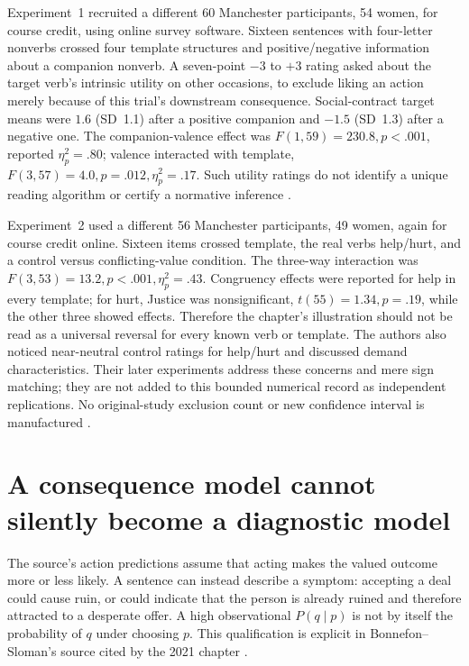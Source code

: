 Experiment~1 recruited a different 60 Manchester participants, 54 women,
for course credit, using online survey software. Sixteen sentences with
four-letter nonverbs crossed four template structures and positive/negative
information about a companion nonverb. A seven-point \(-3\) to \(+3\)
rating asked about the target verb's intrinsic utility on other occasions,
to exclude liking an action merely because of this trial's downstream
consequence. Social-contract target means were \(1.6\) (SD~1.1) after a
positive companion and \(-1.5\) (SD~1.3) after a negative one.
The companion-valence effect was \(F(1,59)=230.8,p<.001\), reported
\(\eta_p^2=.80\); valence interacted with template,
\(F(3,57)=4.0,p=.012,\eta_p^2=.17\). Such utility ratings
do not identify a unique reading algorithm or certify a normative inference
\cite[pp.~354--355]{BonnefonHaighStewart2013Templates}.

Experiment~2 used a different 56 Manchester participants, 49 women, again
for course credit online. Sixteen items crossed template, the real verbs
help/hurt, and a control versus conflicting-value condition. The three-way
interaction was \(F(3,53)=13.2,p<.001,\eta_p^2=.43\).
Congruency effects were reported for help in every template; for hurt,
Justice was nonsignificant, \(t(55)=1.34,p=.19\), while the other
three showed effects. Therefore the chapter's illustration should not be
read as a universal reversal for every known verb or template. The authors
also noticed near-neutral control ratings for help/hurt and discussed demand
characteristics. Their later experiments address these concerns and mere
sign matching; they are not added to this bounded numerical record as
independent replications. No original-study exclusion count or new confidence
interval is manufactured \cite[pp.~355--356]{BonnefonHaighStewart2013Templates}.

\section{A consequence model cannot silently become a diagnostic model}
\label{sec:p19-r64-causal-boundary}

The source's action predictions assume that acting makes the valued outcome
more or less likely. A sentence can instead describe a symptom: accepting
a deal could cause ruin, or could indicate that the person is already ruined
and therefore attracted to a desperate offer. A high observational
\(P(q\mid p)\) is not by itself the probability of \(q\) under choosing
\(p\). This qualification is explicit in Bonnefon--Sloman's source cited
by the 2021 chapter \cite[pp.~195--197]{BonnefonSloman2013Causal}.


